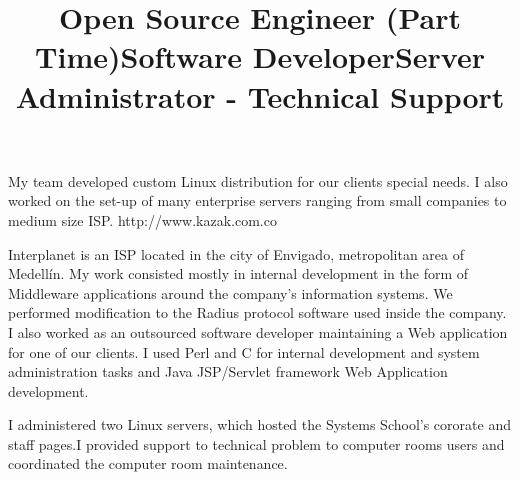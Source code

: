 \begin{resume}
\title{\textbf{Open Source Engineer} (Part Time)}
\begin{position}
My team developed custom  Linux distribution for our clients
special needs. I also worked on  the set-up of many enterprise
servers ranging from small companies to medium size ISP. http://www.kazak.com.co
\end{position}


\title{\textbf{Software Developer}}
\begin{position}
Interplanet is an  ISP located in the city of Envigado, metropolitan area of Medell\'{i}n.
My work consisted mostly  in internal development in the form of
Middleware applications  around the company's information systems.
We performed modification to the Radius protocol software used inside the company.
I also worked as an outsourced software developer maintaining a Web application for one of our clients.  I used Perl and C for internal development and  system administration tasks and Java JSP/Servlet framework Web
Application development.
\end{position}
\newline
\newline
\newline
\newline
\newline
\newline

\title{\textbf{Server Administrator - Technical Support}}
\begin{position}
I administered two Linux servers, which hosted the Systems School's
cororate and staff pages.I provided support to technical problem 
to computer rooms users and coordinated the computer room maintenance.
\end{position}



\end{resume}
